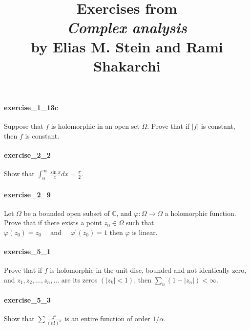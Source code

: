 \documentclass{article}
\title{\textbf{
Exercises from \\
\textit{Complex analysis} \\
by Elias M. Stein and Rami Shakarchi
}}
\date{}
\begin{document}
\maketitle

\paragraph{exercise\_1\_13c} Suppose that $f$ is holomorphic in an open set $\Omega$. Prove that if $|f|$ is constant, then $f$ is constant.

\paragraph{exercise\_2\_2} Show that $\int_{0}^{\infty} \frac{\sin x}{x} d x=\frac{\pi}{2}$.

\paragraph{exercise\_2\_9} Let $\Omega$ be a bounded open subset of $\mathbb{C}$, and $\varphi: \Omega \rightarrow \Omega$ a holomorphic function. Prove that if there exists a point $z_{0} \in \Omega$ such that $\varphi\left(z_{0}\right)=z_{0} \quad \text { and } \quad \varphi^{\prime}\left(z_{0}\right)=1$ then $\varphi$ is linear.

\paragraph{exercise\_5\_1} Prove that if $f$ is holomorphic in the unit disc, bounded and not identically zero, and $z_{1}, z_{2}, \ldots, z_{n}, \ldots$ are its zeros $\left(\left|z_{k}\right|<1\right)$, then $\sum_{n}\left(1-\left|z_{n}\right|\right)<\infty$.

\paragraph{exercise\_5\_3} Show that $\sum \frac{z^{n}}{(n !)^{\alpha}}$ is an entire function of order $1 / \alpha$.
\end{document}

